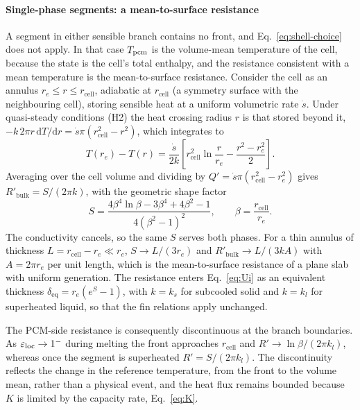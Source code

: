 \paragraph{Single-phase segments: a mean-to-surface resistance}
A segment in either sensible branch contains no front, and
Eq.~\eqref{eq:shell-choice} does not apply. In that case $T_{\mathrm{pcm}}$ is the
volume-mean temperature of the cell, because the state is the cell's total
enthalpy, and the resistance consistent with a mean temperature is the
mean-to-surface resistance. Consider the cell as an annulus
$r_e\le r\le r_\mathrm{cell}$, adiabatic at $r_\mathrm{cell}$ (a symmetry
surface with the neighbouring cell), storing sensible heat at a uniform
volumetric rate $\dot s$. Under quasi-steady conditions (H2) the heat crossing
radius $r$ is that stored beyond it,
$-k\,2\pi r\,\mathrm{d}T/\mathrm{d}r=\dot s\pi(r_\mathrm{cell}^{2}-r^{2})$,
which integrates to
\begin{equation}
  T(r_e)-T(r)=\frac{\dot s}{2k}
  \left[r_\mathrm{cell}^{2}\ln\frac{r}{r_e}-\frac{r^{2}-r_e^{2}}{2}\right].
  \label{eq:bulk-profile}
\end{equation}
Averaging over the cell volume and dividing by
$Q'=\dot s\pi(r_\mathrm{cell}^{2}-r_e^{2})$ gives
$R'_\mathrm{bulk}=S/(2\pi k)$, with the geometric shape factor
\begin{equation}
  S=\frac{4\beta^{4}\ln\beta-3\beta^{4}+4\beta^{2}-1}
         {4\left(\beta^{2}-1\right)^{2}},
  \qquad \beta=\frac{r_\mathrm{cell}}{r_e}.
  \label{eq:shape-factor}
\end{equation}
The conductivity cancels, so the same $S$ serves both phases. For a thin
annulus of thickness $L=r_\mathrm{cell}-r_e\ll r_e$, $S\to L/(3r_e)$ and
$R'_\mathrm{bulk}\to L/(3kA)$ with $A=2\pi r_e$ per unit length, which is the
mean-to-surface resistance of a plane slab with uniform generation. The
resistance enters Eq.~\eqref{eq:Ui} as an equivalent thickness
$\delta_\mathrm{eq}=r_e\left(e^{S}-1\right)$, with $k=k_s$ for subcooled
solid and $k=k_l$ for superheated liquid, so that the fin relations apply
unchanged.

The PCM-side resistance is consequently discontinuous at the branch
boundaries. As $\varepsilon_{\mathrm{loc}}\to1^{-}$ during melting the front approaches
$r_\mathrm{cell}$ and $R'\to\ln\beta/(2\pi k_l)$, whereas once the segment is
superheated $R'=S/(2\pi k_l)$. The discontinuity reflects the change in the
reference temperature, from the front to the volume mean, rather than a
physical event, and the heat flux remains bounded because $K$ is limited by the
capacity rate, Eq.~\eqref{eq:K}.

